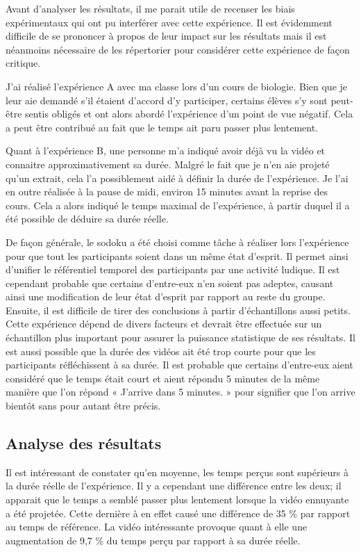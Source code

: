 \documentclass[12pt,fleqn,oneside]{book} %
\begin{document}
Avant d'analyser les résultats, il me parait utile de recenser les biais expérimentaux qui ont pu interférer avec cette expérience. Il est évidemment difficile de se prononcer à propos de leur impact sur les résultats mais il est néanmoins nécessaire de les répertorier pour considérer cette expérience de façon critique.

J'ai réalisé l'expérience A avec ma classe lors d'un cours de biologie. Bien que je leur aie demandé s'il étaient d'accord d'y participer, certains élèves s'y sont peut-être sentis obligés et ont alors abordé l'expérience d'un point de vue négatif. Cela a peut être contribué au fait que le temps ait paru passer plus lentement.

Quant à l'expérience B, une personne m'a indiqué avoir déjà vu la vidéo et connaitre approximativement sa durée. Malgré le fait que je n'en aie projeté qu'un extrait, cela l'a possiblement aidé à définir la durée de l'expérience.
Je l'ai en outre réalisée à la pause de midi, environ 15 minutes avant la reprise des cours. Cela a alors indiqué le temps maximal de l'expérience, à partir duquel il a été possible de déduire sa durée réelle.

De façon générale, le sodoku a été choisi comme tâche à réaliser lors l'expérience pour que tout les participants soient dans un même état d'esprit. Il permet ainsi d'unifier le référentiel temporel des participants par une activité ludique. Il est cependant probable que certains d'entre-eux n'en soient pas adeptes, causant ainsi une modification de leur état d'esprit par rapport au reste du groupe.
Ensuite, il est difficile de tirer des conclusions à partir d'échantillons aussi petits. Cette expérience dépend de divers facteurs et devrait être effectuée sur un échantillon plus important pour assurer la puissance statistique de ses résultats.
Il est aussi possible que la durée des vidéos ait été trop courte pour que les participants réfléchissent à sa durée. Il est probable que certains d'entre-eux aient considéré que le temps était court et aient répondu 5 minutes de la même manière que l'on répond « J'arrive dans 5 minutes. » pour signifier que l'on arrive bientôt sans pour autant être précis. 

\subsection{Analyse des résultats}
Il est intéressant de constater qu'en moyenne, les temps perçus sont supérieurs à la durée réelle de l'expérience. Il y a cependant une différence entre les deux; il apparait que le temps a semblé passer plus lentement lorsque la vidéo ennuyante a été projetée. Cette dernière à en effet causé une différence de 35 \% par rapport au temps de référence. La vidéo intéressante provoque quant à elle une augmentation de 9,7 \% du temps perçu par rapport à sa durée réelle.
\end{document}

